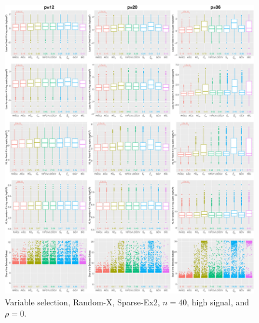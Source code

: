 \begin{figure}[!ht]
\centering
\includegraphics[width=\textwidth]{figures/supplement/randomx/subset_selection/Sparse-Ex2_n40_hsnr_rho0.eps}
\caption{Variable selection, Random-X, Sparse-Ex2, $n=40$, high signal, and $\rho=0$.}
\end{figure}
\clearpage

